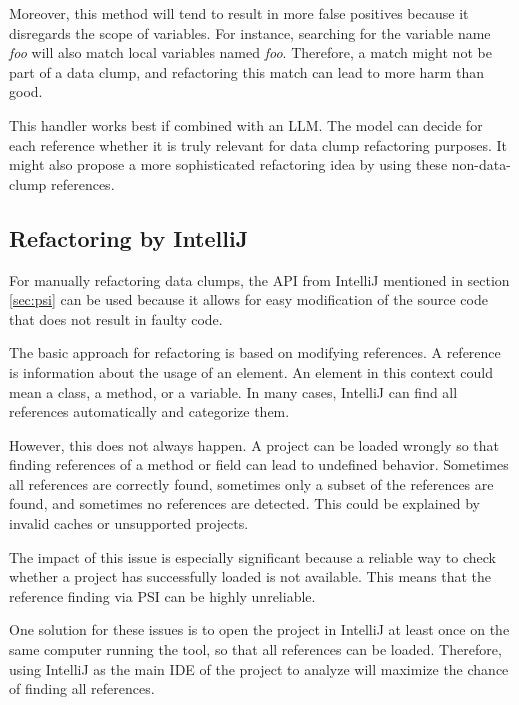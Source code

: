 Moreover, this method will tend to result in more false positives because it disregards the scope of variables. For instance, searching for the variable name \textit{foo} will also match local variables named \textit{foo}. Therefore, a match might not be part of a data clump, and refactoring this match can lead to more harm than good. 

This handler works best if combined with an \ac{LLM}. The model can decide for each reference whether it is truly relevant for data clump refactoring purposes. It might also propose a more sophisticated refactoring idea by using these non-data-clump references. 

\subsection{Refactoring by IntelliJ} \label{sec:intellij_refactoring}

For  manually refactoring data clumps, the  \ac{API} from IntelliJ mentioned in section \ref{sec:psi} can be used because it allows for easy modification of the source code that does not result in faulty code. 





The basic approach for refactoring is based on modifying references. A  reference is  information about the usage of an element. An element in this context could mean a class, a method, or a variable.
In many cases, IntelliJ can find all references automatically and categorize them.

However, this does not always happen. A project can be loaded wrongly so that  finding references of a method or field can lead to undefined behavior. Sometimes all references are correctly found, sometimes only a subset of the references are found, and sometimes no references are detected. This could be explained by invalid caches or unsupported projects.

The impact of this issue is especially significant because a reliable way to check  whether a project has successfully loaded is not available. This means that the reference finding via \ac{PSI} can be highly unreliable. 

One solution for these issues is to open the project in IntelliJ at least once  on the same computer running the tool, so that all references can be loaded. Therefore, using IntelliJ as the main \ac{IDE} of the project to analyze will maximize the chance of finding all references.



